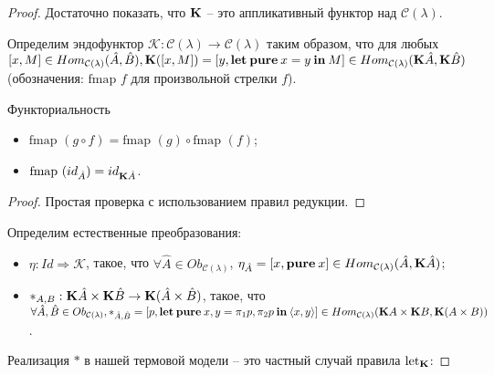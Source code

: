 \begin{proof}
Достаточно показать, что ${\bf K}$ -- это аппликативный функтор над $\mathcal{C}(\lambda)$.

\begin{defin}
  Определим эндофунктор $\mathcal{K} : \mathcal{C}(\lambda) \to \mathcal{C}(\lambda)$ таким образом, что
для любых $[x,M] \in Hom_{\mathcal{C}(\lambda)}(\hat{A},\hat{B}), {\bf K}([x,M]) = [y, {\bf let \: pure \:} x = y {\: \bf in \:} M] \in Hom_{\mathcal{C}(\lambda)}({\bf K} \hat{A}, {\bf K} \hat{B})$
(обозначения: $\text{fmap } f$ для произвольной стрелки $f$).

\end{defin}

\begin{lemma} Функториальность

\begin{itemize}
  \item $\text{fmap }(g \circ f) = \text{fmap }(g) \circ \text{fmap }(f)$;
  \item $\text{fmap }(id_{\hat{A}}) = id_{{\bf K}\hat{A}}$.
\end{itemize}
\end{lemma}

\begin{proof}

Простая проверка с использованием правил редукции.

\end{proof}

\begin{defin}

  Определим естественные преобразования:

\begin{itemize}
  \item $\eta:Id \Rightarrow \mathcal{K}$, такое, что $\forall \hat{A} \in Ob_{\mathcal{C}(\lambda)}$, $\eta_{\hat{A}} = [x, {\bf pure \:} x] \in Hom_{\mathcal{C}(\lambda)}(\hat{A}, {\bf K}\hat{A})$;
  \item $\ast_{A,B}:{\bf K}\hat{A} \times {\bf K}\hat{B} \to {\bf K}(\hat{A} \times \hat{B})$, такое, что $\forall \hat{A}, \hat{B} \in Ob_{\mathcal{C}(\lambda)}, \ast_{\hat{A},\hat{B}} = [p, {\bf let \: pure \:} x,y = \pi_1 p, \pi_2 p {\: \bf in \:} \langle x, y \rangle] \in Hom_{\mathcal{C}(\lambda)}({\bf K}A \times {\bf K}B, {\bf K}(A \times B))$.
\end{itemize}
\end{defin}

Реализация $\ast$ в нашей термовой модели -- это частный случай правила ${\text{let}_{\bf K}}$:


\end{proof}
